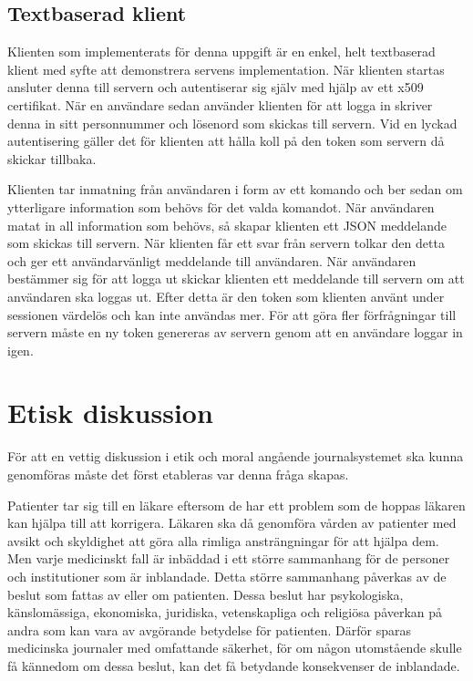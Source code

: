 \documentclass[a4paper]{article}
\begin{document}
\subsection{Textbaserad klient}
Klienten som implementerats för denna uppgift är en enkel, helt textbaserad klient med syfte att demonstrera servens implementation. När klienten startas ansluter denna till servern och autentiserar sig själv med hjälp av ett x509 certifikat. När en användare sedan använder klienten för att logga in skriver denna in sitt personnummer och lösenord som skickas till servern. Vid en lyckad autentisering gäller det för klienten att hålla koll på den token som servern då skickar tillbaka.

Klienten tar inmatning från användaren i form av ett komando och ber sedan om ytterligare information som behövs för det valda komandot. När användaren matat in all information som behövs, så skapar klienten ett JSON meddelande som skickas till servern. När klienten får ett svar från servern tolkar den detta och ger ett användarvänligt meddelande till användaren. När användaren bestämmer sig för att logga ut skickar klienten ett meddelande till servern om att användaren ska loggas ut. Efter detta är den token som klienten använt under sessionen värdelös och kan inte användas mer. För att göra fler förfrågningar till servern måste en ny token genereras av servern genom att en användare loggar in igen.

\section{Etisk diskussion}
För att en vettig diskussion i etik och moral angående journalsystemet ska kunna genomföras måste det först etableras var denna fråga skapas.

Patienter tar sig till en läkare eftersom de har ett problem som de hoppas läkaren kan hjälpa till att korrigera. Läkaren ska då genomföra vården av patienter med avsikt och skyldighet att göra alla rimliga ansträngningar för att hjälpa dem. Men varje medicinskt fall är inbäddad i ett större sammanhang för de personer och institutioner som är inblandade. Detta större sammanhang påverkas av de beslut som fattas av eller om patienten. Dessa beslut har psykologiska, känslomässiga, ekonomiska, juridiska, vetenskapliga och religiösa påverkan på andra som kan vara av avgörande betydelse för patienten. Därför sparas medicinska journaler med omfattande säkerhet, för om någon utomstående skulle få kännedom om dessa beslut, kan det få betydande konsekvenser de inblandade.
\end{document}
